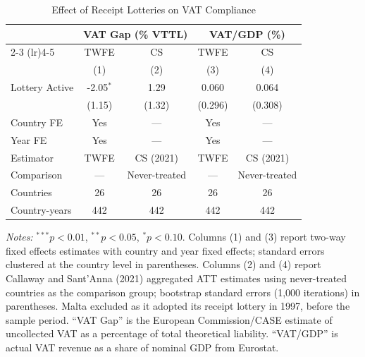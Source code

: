 \begin{table}[htbp]
\centering
\caption{Effect of Receipt Lotteries on VAT Compliance}
\label{tab:main}
\begin{threeparttable}
\begin{tabular}{lcccc}
\hline\hline
 & \multicolumn{2}{c}{VAT Gap (\% VTTL)} & \multicolumn{2}{c}{VAT/GDP (\%)} \\
\cmidrule(lr){2-3} \cmidrule(lr){4-5}
 & TWFE & CS & TWFE & CS \\
 & (1) & (2) & (3) & (4) \\
\hline
Lottery Active & -2.05$^{*}$ & 1.29 & 0.060 & 0.064 \\
 & (1.15) & (1.32) & (0.296) & (0.308) \\
\addlinespace
Country FE & Yes & --- & Yes & --- \\
Year FE & Yes & --- & Yes & --- \\
Estimator & TWFE & CS (2021) & TWFE & CS (2021) \\
Comparison & --- & Never-treated & --- & Never-treated \\
Countries & 26 & 26 & 26 & 26 \\
Country-years & 442 & 442 & 442 & 442 \\
\hline\hline
\end{tabular}
\begin{tablenotes}[flushleft]
\small
\item \textit{Notes:} $^{***}p<0.01$, $^{**}p<0.05$, $^{*}p<0.10$. Columns (1) and (3) report two-way fixed effects estimates with country and year fixed effects; standard errors clustered at the country level in parentheses. Columns (2) and (4) report Callaway and Sant'Anna (2021) aggregated ATT estimates using never-treated countries as the comparison group; bootstrap standard errors (1,000 iterations) in parentheses. Malta excluded as it adopted its receipt lottery in 1997, before the sample period. ``VAT Gap'' is the European Commission/CASE estimate of uncollected VAT as a percentage of total theoretical liability. ``VAT/GDP'' is actual VAT revenue as a share of nominal GDP from Eurostat.
\end{tablenotes}
\end{threeparttable}
\end{table}

